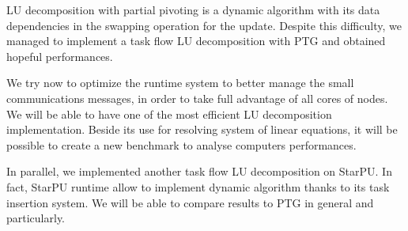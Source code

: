 LU decomposition with partial pivoting is a dynamic algorithm with its data dependencies in the swapping operation for the update. Despite this difficulty, we managed to implement a task flow LU decomposition with PTG and obtained hopeful performances.

We try now to optimize the \dague runtime system to better manage the small communications messages, in order to take full advantage of all cores of nodes. We will be able to have one of the most efficient LU decomposition implementation. Beside its use for resolving system of linear equations, it will be possible to create a new benchmark to analyse computers performances.

In parallel, we implemented another task flow LU decomposition on StarPU. In fact, StarPU runtime allow to implement dynamic algorithm  thanks to its task insertion system. We will be able to compare results to PTG in general and \dague particularly.